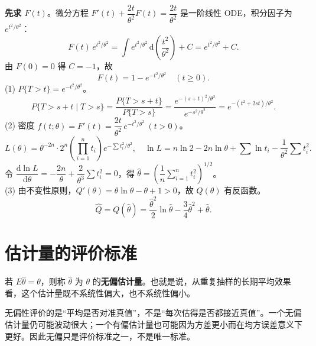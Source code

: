 ﻿\documentclass[lang=cn,11pt]{elegantbook}
\begin{document}
\begin{solution}
\textbf{先求 \(F(t)\)}。微分方程 \(F'(t) + \dfrac{2t}{\theta^2}F(t) = \dfrac{2t}{\theta^2}\) 是一阶线性 ODE，积分因子为 \(e^{t^2/\theta^2}\)：
\[
F(t)\,e^{t^2/\theta^2} = \int e^{t^2/\theta^2}\,\mathrm{d}\!\left(\frac{t^2}{\theta^2}\right) + C = e^{t^2/\theta^2} + C.
\]
由 \(F(0)=0\) 得 \(C=-1\)，故
\[
F(t) = 1 - e^{-t^2/\theta^2}\quad(t \geq 0).
\]
(1) \(P\{T > t\} = e^{-t^2/\theta^2}\)。
\[
P\{T > s+t \mid T > s\} = \frac{P\{T > s+t\}}{P\{T > s\}} = \frac{e^{-(s+t)^2/\theta^2}}{e^{-s^2/\theta^2}} = e^{-(t^2+2st)/\theta^2}.
\]
(2) 密度 \(f(t;\theta) = F'(t) = \dfrac{2t}{\theta^2}\,e^{-t^2/\theta^2}\ (t > 0)\)。
\[
L(\theta) = \theta^{-2n}\cdot 2^n\!\left(\prod_{i=1}^{n}t_i\right)e^{-\sum t_i^2/\theta^2},\quad
\ln L = n\ln 2 - 2n\ln\theta + \sum\ln t_i - \frac{1}{\theta^2}\sum t_i^2.
\]
令 \(\dfrac{\mathrm{d}\ln L}{\mathrm{d}\theta} = -\dfrac{2n}{\theta} + \dfrac{2}{\theta^3}\sum t_i^2 = 0\)，得 \(\hat{\theta} = \displaystyle\left(\dfrac{1}{n}\sum_{i=1}^{n}t_i^2\right)^{\!1/2}\)。\\
(3) 由不变性原则，\(Q'(\theta) = \theta\ln\theta - \theta + 1>0\)，故 \(Q(\theta)\) 有反函数。
\[
\hat{Q} = Q(\hat{\theta}) = \frac{\hat{\theta}^2}{2}\ln\hat{\theta} - \frac{3}{4}\hat{\theta}^2 + \hat{\theta}.
\]
\end{solution}



\section{估计量的评价标准} \label{subsec:criteria}

\begin{definition}[无偏性] \label{def:unbiased}
若 \(E\hat{\theta} = \theta\)，则称 \(\hat{\theta}\) 为 \(\theta\) 的\textbf{无偏估计量}。也就是说，从重复抽样的长期平均效果看，这个估计量既不系统性偏大，也不系统性偏小。
\end{definition}

\begin{note}
无偏性评价的是“平均是否对准真值”，不是“每次估得是否都接近真值”。一个无偏估计量仍可能波动很大；一个有偏估计量也可能因为方差更小而在均方误差意义下更好。因此无偏只是评价标准之一，不是唯一标准。
\end{note}
\end{document}
